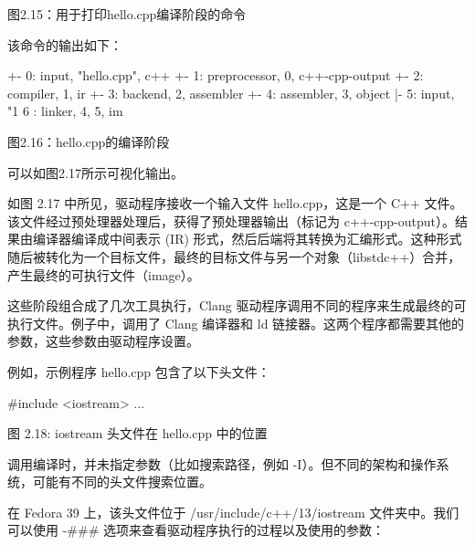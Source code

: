 \begin{center}
图2.15：用于打印hello.cpp编译阶段的命令
\end{center}

该命令的输出如下：

\begin{shell}
            +- 0: input, "hello.cpp", c++
         +- 1: preprocessor, {0}, c++-cpp-output
      +- 2: compiler, {1}, ir
   +- 3: backend, {2}, assembler
+- 4: assembler, {3}, object
|- 5: input, "1%
6 : linker, {4, 5}, im
\end{shell}

\begin{center}
图2.16：hello.cpp的编译阶段
\end{center}

可以如图2.17所示可视化输出。

如图 2.17 中所见，驱动程序接收一个输入文件 hello.cpp，这是一个 C++ 文件。该文件经过预处理器处理后，获得了预处理器输出（标记为 c++-cpp-output）。结果由编译器编译成中间表示 (IR) 形式，然后后端将其转换为汇编形式。这种形式随后被转化为一个目标文件，最终的目标文件与另一个对象（libstdc++）合并，产生最终的可执行文件（image）。

\newpage



这些阶段组合成了几次工具执行，Clang 驱动程序调用不同的程序来生成最终的可执行文件。例子中，调用了 Clang 编译器和 ld 链接器。这两个程序都需要其他的参数，这些参数由驱动程序设置。

例如，示例程序 hello.cpp 包含了以下头文件：

\begin{cpp}
#include <iostream>
...
\end{cpp}

\begin{center}
图 2.18: iostream 头文件在 hello.cpp 中的位置
\end{center}

调用编译时，并未指定参数（比如搜索路径，例如 -I）。但不同的架构和操作系统，可能有不同的头文件搜索位置。

在 Fedora 39 上，该头文件位于 /usr/include/c++/13/iostream 文件夹中。我们可以使用 -\#\#\# 选项来查看驱动程序执行的过程以及使用的参数：


